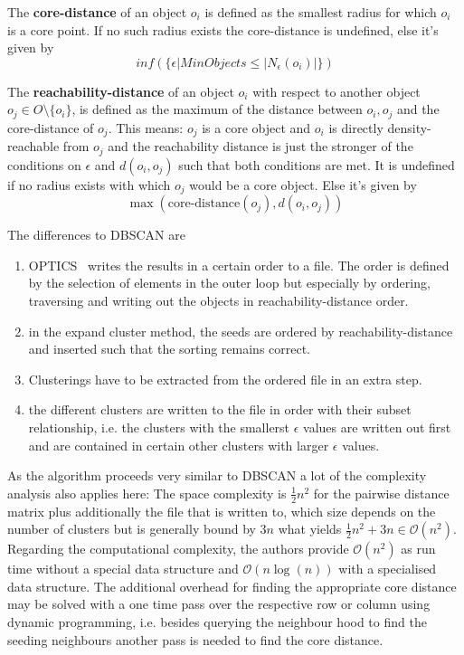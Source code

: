The \textbf{core-distance} of an object $o_i$ is defined as the smallest radius for which $o_i$ is a core point. If no such radius exists the core-distance is undefined, else it's given by  \[ inf(\{\epsilon | MinObjects \leq |N_\epsilon(o_i)| \})\]

The \textbf{reachability-distance} of an object $o_i$ with respect to another object $o_j \in O\setminus \{o_i\}$, is defined as the maximum of the distance between $o_i, o_j$ and the core-distance of $o_j$. This means: $o_j$ is a core object and $o_i$ is directly density-reachable from $o_j$ and the reachability distance is just the stronger of the conditions on $\epsilon$ and $d(o_i, o_j)$ such that both conditions are met. It is undefined if no radius exists with which $o_j$ would be a core object. Else it's given by \[ \max(\text{core-distance}(o_j), d(o_i, o_j)) \]

The differences to DBSCAN are 
\begin{enumerate}
    \item OPTICS~\cite{optics} writes the results in a certain order to a file. The order is defined by the selection of elements in the outer loop but especially by ordering, traversing and writing out the objects in reachability-distance order.
    \item in the expand cluster method, the seeds are ordered by reachability-distance and inserted such that the sorting remains correct.
    \item Clusterings have to be extracted from the ordered file in an extra step.
    \item the different clusters are written to the file in order with their subset relationship, i.e. the clusters with the smallerst $\epsilon$ values are written out first and are contained in certain other clusters with larger $\epsilon$ values.
\end{enumerate}

As the algorithm proceeds very similar to DBSCAN a lot of the complexity analysis also applies here: The space complexity is $\frac{1}{2}n^2$ for the pairwise distance matrix plus additionally the file that is written to, which size depends on the number of clusters but is generally bound by $3n$ what yields $\frac{1}{2}n^2 + 3n \in \mathcal{O}(n^2)$. Regarding the computational complexity, the authors provide $\mathcal{O}(n^2)$ as run time without a special data structure and $\mathcal{O}(n \log(n))$ with a specialised data structure\cite{optics}. The additional overhead for finding the appropriate core distance may be solved with a one time pass over the respective row or column using dynamic programming, i.e. besides querying the neighbour hood to find the seeding neighbours another pass is needed to find the core distance. \\



